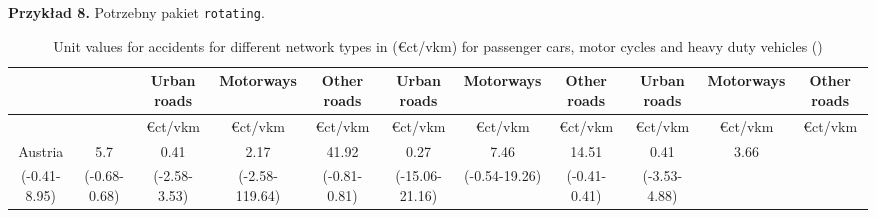 \documentclass{article}
\begin{document}
\vspace{.5cm}
\textbf{Przykład 8.} Potrzebny pakiet \verb|rotating|.
\vspace{.5cm}
\begin{sidewaystable}
	\caption{Unit values for accidents for different network types in (\euro ct/vkm) for passenger cars, motor cycles and heavy duty vehicles ()}
	\label{tab:UnitValuesForAccidentsForDifferentNetworkTypesInCtVkmForPassengerCarsMotorCyclesAndHeavyDutyVehicles2000}
	\centering
	\tiny
	\begin{tabular}{|c|c|c|c|c|c|c|c|c|c|c|} \hline
		& & Urban roads & Motorways & Other roads & Urban roads & Motorways & Other roads & Urban roads & Motorways & Other roads\\
		\hline
		& & \euro ct/vkm & \euro ct/vkm & \euro ct/vkm & \euro ct/vkm & \euro ct/vkm & \euro ct/vkm & \euro ct/vkm & \euro ct/vkm & \euro ct/vkm\\\hline
		Austria & 5.7 & 0.41 & 2.17 & 41.92 & 0.27 & 7.46 & 14.51 & 0.41 & 3.66& \\
		(-0.41-8.95) & (-0.68-0.68) & (-2.58-3.53) & (-2.58-119.64) & (-0.81-0.81) & (-15.06-21.16) & (-0.54-19.26) & (-0.41-0.41) & (-3.53-4.88)&&\\\hline
	\end{tabular}
\end{sidewaystable}
\end{document}
